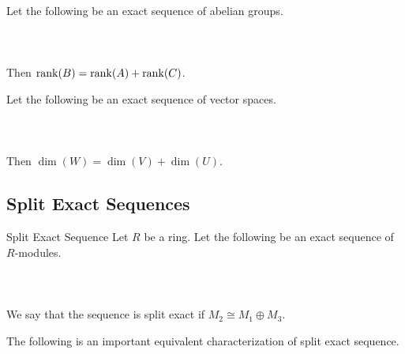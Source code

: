 \documentclass[a4paper]{article}
\begin{document}
\begin{lmm}{}{} Let the following be an exact sequence of abelian groups. \\~\\
\\~\\
Then $\rank(B)=\rank(A)+\rank(C)$. 
\end{lmm}

\begin{lmm}{}{} Let the following be an exact sequence of vector spaces. \\~\\
\\~\\
Then $\dim(W)=\dim(V)+\dim(U)$. 
\end{lmm}


\subsection{Split Exact Sequences}
\begin{defn}{Split Exact Sequence}{} Let $R$ be a ring. Let the following be an exact sequence of $R$-modules. \\~\\
\\~\\
We say that the sequence is split exact if $M_2\cong M_1\oplus M_3$. 
\end{defn}

The following is an important equivalent characterization of split exact sequence. 
\end{document}

